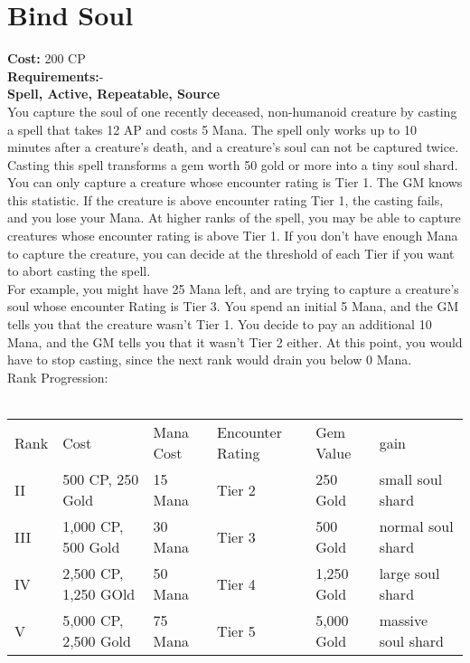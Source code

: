 \section{Bind Soul}\label{spell:bindSoul}
\textbf{Cost:} 200 CP\\
\textbf{Requirements:}-\\
\textbf{Spell, Active, Repeatable, Source}\\
You capture the soul of one recently deceased, non-humanoid creature by casting a spell that takes 12 AP and costs 5 Mana.
The spell only works up to 10 minutes after a creature's death, and a creature's soul can not be captured twice.
Casting this spell transforms a gem worth 50 gold or more into a tiny soul shard.\\
You can only capture a creature whose encounter rating is Tier 1.
The GM knows this statistic.
If the creature is above encounter rating Tier 1, the casting fails, and you lose your Mana.
At higher ranks of the spell, you may be able to capture creatures whose encounter rating is above Tier 1.
If you don't have enough Mana to capture the creature, you can decide at the threshold of each Tier if you want to abort casting the spell.\\
For example, you might have 25 Mana left, and are trying to capture a creature's soul whose encounter Rating is Tier 3.
You spend an initial 5 Mana, and the GM tells you that the creature wasn't Tier 1.
You decide to pay an additional 10 Mana, and the GM tells you that it wasn't Tier 2 either.
At this point, you would have to stop casting, since the next rank would drain you below 0 Mana.
\\
Rank Progression:\\
\\
\begin{longtable}{l | l | l | l | l | l}
    Rank & Cost & Mana Cost & Encounter Rating & Gem Value & gain\\
    II & 500 CP, 250 Gold & 15 Mana & Tier 2 & 250 Gold & small soul shard\\
    III & 1,000 CP, 500 Gold & 30 Mana & Tier 3 & 500 Gold & normal soul shard\\
    IV & 2,500 CP, 1,250 GOld & 50 Mana & Tier 4 & 1,250 Gold & large soul shard\\
    V & 5,000 CP, 2,500 Gold & 75 Mana & Tier 5 & 5,000 Gold & massive soul shard\\
\end{longtable}